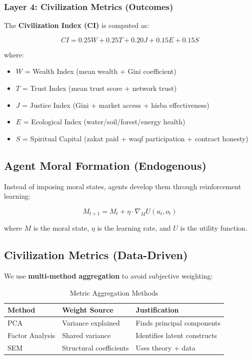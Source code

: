 \documentclass[12pt,a4paper]{article}
\begin{document}
\subsubsection{Layer 4: Civilization Metrics (Outcomes)}

The \textbf{Civilization Index (CI)} is computed as:

\begin{equation}
CI = 0.25W + 0.25T + 0.20J + 0.15E + 0.15S
\end{equation}

where:
\begin{itemize}
    \item $W$ = Wealth Index (mean wealth + Gini coefficient)
    \item $T$ = Trust Index (mean trust score + network trust)
    \item $J$ = Justice Index (Gini + market access + hisba effectiveness)
    \item $E$ = Ecological Index (water/soil/forest/energy health)
    \item $S$ = Spiritual Capital (zakat paid + waqf participation + contract honesty)
\end{itemize}

\subsection{Agent Moral Formation (Endogenous)}

Instead of imposing moral states, agents develop them through reinforcement learning:

\begin{equation}
M_{t+1} = M_t + \eta \cdot \nabla_M U(a_t, o_t)
\end{equation}

where $M$ is the moral state, $\eta$ is the learning rate, and $U$ is the utility function.

\subsection{Civilization Metrics (Data-Driven)}

We use \textbf{multi-method aggregation} to avoid subjective weighting:

\begin{table}[H]
\centering
\caption{Metric Aggregation Methods}
\label{tab:metrics}
\begin{tabular}{p{3cm} p{5cm} p{5cm}}
\toprule
\textbf{Method} & \textbf{Weight Source} & \textbf{Justification} \\
\midrule
PCA & Variance explained & Finds principal components \\
Factor Analysis & Shared variance & Identifies latent constructs \\
SEM & Structural coefficients & Uses theory + data \\
\bottomrule
\end{tabular}
\end{table}
\end{document}
